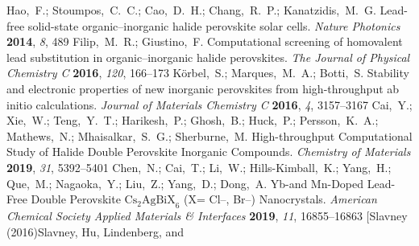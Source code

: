 \documentclass[journal=jpclcd,manuscript=letter]{achemso}
\begin{document}
\begin{mcitethebibliography}{49}
\EndOfBibitem
{}
Hao,~F.; Stoumpos,~C.~C.; Cao,~D.~H.; Chang,~R.~P.; Kanatzidis,~M.~G. Lead-free
  solid-state organic--inorganic halide perovskite solar cells. \emph{Nature
  Photonics} \textbf{2014}, \emph{8}, 489\relax
\mciteBstWouldAddEndPuncttrue
\mciteSetBstMidEndSepPunct{\mcitedefaultmidpunct}
{\mcitedefaultendpunct}{\mcitedefaultseppunct}\relax
\EndOfBibitem
{}
Filip,~M.~R.; Giustino,~F. Computational screening of homovalent lead
  substitution in organic--inorganic halide perovskites. \emph{The Journal of
  Physical Chemistry C} \textbf{2016}, \emph{120}, 166--173\relax
\mciteBstWouldAddEndPuncttrue
\mciteSetBstMidEndSepPunct{\mcitedefaultmidpunct}
{\mcitedefaultendpunct}{\mcitedefaultseppunct}\relax
\EndOfBibitem
{}
K{\"o}rbel,~S.; Marques,~M.~A.; Botti,~S. Stability and electronic properties
  of new inorganic perovskites from high-throughput ab initio calculations.
  \emph{Journal of Materials Chemistry C} \textbf{2016}, \emph{4},
  3157--3167\relax
\mciteBstWouldAddEndPuncttrue
\mciteSetBstMidEndSepPunct{\mcitedefaultmidpunct}
{\mcitedefaultendpunct}{\mcitedefaultseppunct}\relax
\EndOfBibitem
{}
Cai,~Y.; Xie,~W.; Teng,~Y.~T.; Harikesh,~P.; Ghosh,~B.; Huck,~P.;
  Persson,~K.~A.; Mathews,~N.; Mhaisalkar,~S.~G.; Sherburne,~M. 
  High-throughput Computational Study of Halide Double Perovskite Inorganic
  Compounds. \emph{Chemistry of Materials} \textbf{2019}, \emph{31},
  5392--5401\relax
\mciteBstWouldAddEndPuncttrue
\mciteSetBstMidEndSepPunct{\mcitedefaultmidpunct}
{\mcitedefaultendpunct}{\mcitedefaultseppunct}\relax
\EndOfBibitem
{}
Chen,~N.; Cai,~T.; Li,~W.; Hills-Kimball,~K.; Yang,~H.; Que,~M.; Nagaoka,~Y.;
  Liu,~Z.; Yang,~D.; Dong,~A.   Yb-and Mn-Doped Lead-Free Double
  Perovskite ${\mathrm{Cs}}_{2}{\mathrm{AgBiX}}_{6}$ (X= Cl--, Br--)
  Nanocrystals. \emph{American Chemical Society Applied Materials \&
  Interfaces} \textbf{2019}, \emph{11}, 16855--16863\relax
\mciteBstWouldAddEndPuncttrue
\mciteSetBstMidEndSepPunct{\mcitedefaultmidpunct}
{\mcitedefaultendpunct}{\mcitedefaultseppunct}\relax
\EndOfBibitem
\bibitem[Slavney (2016)Slavney, Hu, Lindenberg, and

\end{mcitethebibliography}
\end{document}
